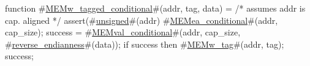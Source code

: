 function #\hyperref[zMEMwzytaggedzyconditional]{MEMw\_tagged\_conditional}#(addr, tag, data) =
{
  /* assumes addr is cap. aligned */
  assert(#\hyperref[zunsigned]{unsigned}#(addr) %
  #\hyperref[zMEMeazyconditional]{MEMea\_conditional}#(addr, cap_size);
  success = #\hyperref[zMEMvalzyconditional]{MEMval\_conditional}#(addr, cap_size, #\hyperref[zreversezyendianness]{reverse\_endianness}#(data));
  if success then
     #\hyperref[zMEMwzytag]{MEMw\_tag}#(addr, tag);
  success;
}

